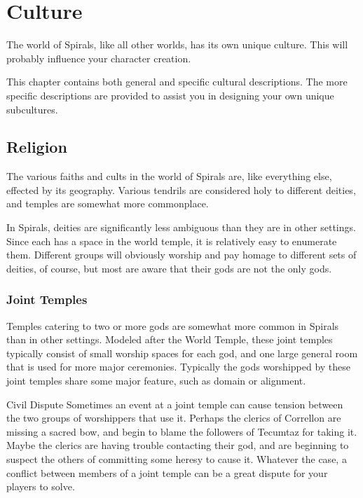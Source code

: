 \chapter{Culture}
The world of Spirals, like all other worlds, has its own unique culture.
This will probably influence your character creation.

This chapter contains both general and specific cultural descriptions.
The more specific descriptions are provided to assist you in designing your own unique subcultures.

\begin{multicols}{2}
\section{Religion}
The various faiths and cults in the world of Spirals are, like everything else, effected by its geography.
Various tendrils are considered holy to different deities, and temples are somewhat more commonplace.

In Spirals, deities are significantly less ambiguous than they are in other settings.
Since each has a space in the world temple, it is relatively easy to enumerate them.
Different groups will obviously worship and pay homage to different sets of deities, of course, but most are aware that their gods are not the only gods.

\subsection{Joint Temples}
Temples catering to two or more gods are somewhat more common in Spirals than in other settings.
Modeled after the World Temple, these joint temples typically consist of small worship spaces for each god, and one large general room that is used for more major ceremonies.
Typically the gods worshipped by these joint temples share some major feature, such as domain or alignment.

\begin{adventureidea}{Civil Dispute}
Sometimes an event at a joint temple can cause tension between the two groups of worshippers that use it.
Perhaps the clerics of Correllon are missing a sacred bow, and begin to blame the followers of Tecumtaz for taking it.
Maybe the clerics are having trouble contacting their god, and are beginning to suspect the others of committing some heresy to cause it.
Whatever the case, a conflict between members of a joint temple can be a great dispute for your players to solve.
\end{adventureidea}


\end{multicols}
